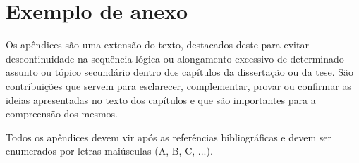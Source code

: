 \chapter{Exemplo de anexo}


Os apêndices são uma extensão do texto, destacados deste para evitar descontinuidade na sequência lógica ou alongamento excessivo de determinado assunto ou tópico secundário dentro dos capítulos da dissertação ou da tese. São contribuições que servem para esclarecer, complementar, provar ou confirmar as ideias apresentadas no texto dos capítulos e que são importantes para a compreensão dos mesmos.

Todos os apêndices devem vir após as referências bibliográficas e devem ser enumerados por letras maiúsculas (A, B, C, ...).










